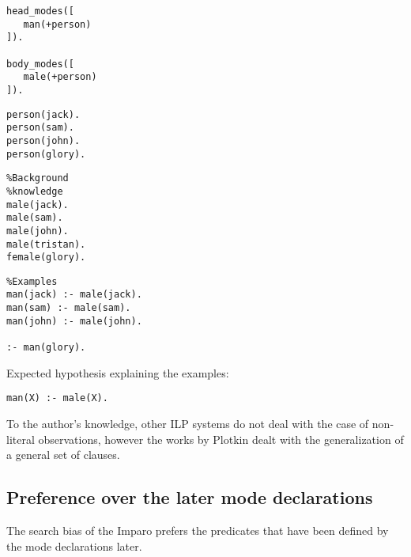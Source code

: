 \begin{minipage}[t]{.25\textwidth}
\begin{lstlisting}
head_modes([
   man(+person)
]).

body_modes([
   male(+person)
]).\end{lstlisting}
\end{minipage}
\begin{minipage}[t]{.20\textwidth}
\begin{lstlisting}
person(jack).
person(sam).
person(john).
person(glory).
\end{lstlisting}
\end{minipage}
\begin{minipage}[t]{.20\textwidth}
\begin{lstlisting}
%Background
%knowledge
male(jack).
male(sam).
male(john).
male(tristan).
female(glory).
\end{lstlisting}
\end{minipage}
\begin{minipage}[t]{.25\textwidth}
\begin{lstlisting}
%Examples
man(jack) :- male(jack).
man(sam) :- male(sam).
man(john) :- male(john).

:- man(glory).
\end{lstlisting}
\end{minipage}

Expected hypothesis explaining the examples:

\begin{lstlisting}
man(X) :- male(X).
\end{lstlisting}

To the author's knowledge, other ILP systems do not deal with the case of non-literal observations, however the works by Plotkin dealt with the generalization of a general set of clauses.

\subsection{Preference over the later mode declarations}\label{imparo_preference_over_later_mode_declarations}
The search bias of the Imparo prefers the predicates that have been defined by the mode declarations later.

